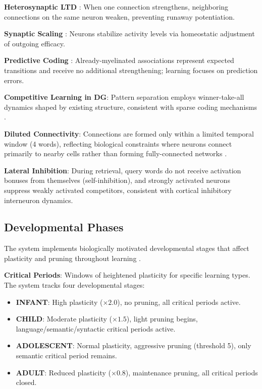 \documentclass[11pt]{article}
\begin{document}
\textbf{Heterosynaptic LTD} \citep{rolls2013mechanisms}: When one connection strengthens,
neighboring connections on the same neuron weaken, preventing runaway potentiation.

\textbf{Synaptic Scaling} \citep{turrigiano2008self}: Neurons stabilize activity levels via
homeostatic adjustment of outgoing efficacy.

\textbf{Predictive Coding} \citep{rao1999predictive}: Already-myelinated associations represent
expected transitions and receive no additional strengthening; learning focuses on prediction errors.

\textbf{Competitive Learning in DG}: Pattern separation employs winner-take-all dynamics shaped by
existing structure, consistent with sparse coding mechanisms \citep{rolls2007attractor}.

\textbf{Diluted Connectivity}: Connections are formed only within a limited temporal window
(4 words), reflecting biological constraints where neurons connect primarily to nearby cells
rather than forming fully-connected networks \citep{rolls2007attractor}.

\textbf{Lateral Inhibition}: During retrieval, query words do not receive activation bonuses
from themselves (self-inhibition), and strongly activated neurons suppress weakly activated
competitors, consistent with cortical inhibitory interneuron dynamics.

\subsection{Developmental Phases}

The system implements biologically motivated developmental stages that affect plasticity
and pruning throughout learning \citep{hensch2005critical,hubel1970period}.

\textbf{Critical Periods}: Windows of heightened plasticity for specific learning types.
The system tracks four developmental stages:

\begin{itemize}
\item \textbf{INFANT}: High plasticity ($\times 2.0$), no pruning, all critical periods active.
\item \textbf{CHILD}: Moderate plasticity ($\times 1.5$), light pruning begins, language/semantic/syntactic
      critical periods active.
\item \textbf{ADOLESCENT}: Normal plasticity, aggressive pruning (threshold 5), only semantic
      critical period remains.
\item \textbf{ADULT}: Reduced plasticity ($\times 0.8$), maintenance pruning, all critical periods closed.
\end{itemize}
\end{document}
